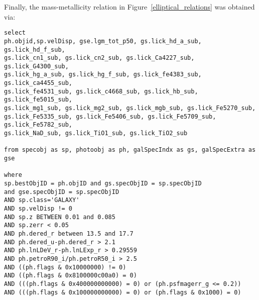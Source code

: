 \documentclass[12pt,preprint]{aastex}
\begin{document}
Finally, the mass-metallicity relation in Figure~\ref{elliptical_relations} was obtained via:
\begin{verbatim}
select 
ph.objid,sp.velDisp, gse.lgm_tot_p50, gs.lick_hd_a_sub, gs.lick_hd_f_sub, 
gs.lick_cn1_sub, gs.lick_cn2_sub, gs.lick_Ca4227_sub, gs.lick_G4300_sub, 
gs.lick_hg_a_sub, gs.lick_hg_f_sub, gs.lick_fe4383_sub, gs.lick_ca4455_sub, 
gs.lick_fe4531_sub, gs.lick_c4668_sub, gs.lick_hb_sub, gs.lick_fe5015_sub, 
gs.lick_mg1_sub, gs.lick_mg2_sub, gs.lick_mgb_sub, gs.lick_Fe5270_sub, 
gs.lick_Fe5335_sub, gs.lick_Fe5406_sub, gs.lick_Fe5709_sub, gs.lick_Fe5782_sub, 
gs.lick_NaD_sub, gs.lick_TiO1_sub, gs.lick_TiO2_sub 

from specobj as sp, photoobj as ph, galSpecIndx as gs, galSpecExtra as gse

where
sp.bestObjID = ph.objID and gs.specObjID = sp.specObjID 
and gse.specObjID = sp.specObjID
AND sp.class='GALAXY'
AND sp.velDisp != 0
AND sp.z BETWEEN 0.01 and 0.085
AND sp.zerr < 0.05
AND ph.dered_r between 13.5 and 17.7
AND ph.dered_u-ph.dered_r > 2.1
AND ph.lnLDeV_r-ph.lnLExp_r > 0.29559
AND ph.petroR90_i/ph.petroR50_i > 2.5
AND ((ph.flags & 0x10000000) != 0)
AND ((ph.flags & 0x8100000c00a0) = 0)
AND (((ph.flags & 0x400000000000) = 0) or (ph.psfmagerr_g <= 0.2))
AND (((ph.flags & 0x100000000000) = 0) or (ph.flags & 0x1000) = 0)
\end{verbatim}
\end{document}
